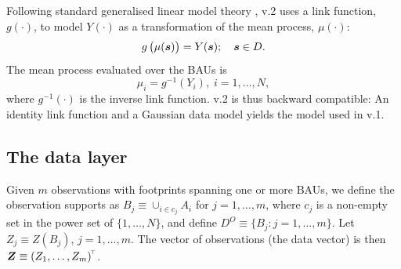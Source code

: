 \documentclass[article]{jss}
\def\mbf#1{{%
\mathchoice%
{\hbox{\boldmath$\displaystyle{#1}$}}%
{\hbox{\boldmath$\textstyle{#1}$}}%
{\hbox{\boldmath$\scriptstyle{#1}$}}%
{\hbox{\boldmath$\scriptscriptstyle{#1}$}}%
}}
\def\vec{\mbf}
\newcommand{\tp}{{\!\scriptscriptstyle \top}}
\begin{document}
Following standard generalised linear model theory \citep{McCullagh_Nelder_1989_GLM},  v.2 uses a link function, $g(\cdot)$, to model $Y(\cdot)$ as a transformation of the mean process, $\mu(\cdot)$:
\[
g\left(\mu(\vec{s})\right) = Y(\vec{s}); \quad \vec{s} \in D.
\]
The mean process evaluated over the BAUs is 
\[
\mu_i = g^{-1}(Y_i), \; i = 1, \dots, N,
\]
where $g^{-1}(\cdot)$ is the inverse link function. 
  v.2 is thus backward compatible: An identity link function and a Gaussian data model yields the model used in  v.1.


\subsection{The data layer}\label{subsection:04-02:DataLayer}




Given $m$ observations with footprints spanning one or more BAUs, we define the observation supports as $B_j \equiv \cup_{i\in c_j} A_i$ for $j = 1, \dots, m$, where $c_j$ is a non-empty set in the power set of $\{1, \dots, N\}$, and define $D^O \equiv \{B_j : j = 1, \dots, m\}$. 
Let $Z_j \equiv Z(B_j)$, $j = 1, \dots, m$. 
The vector of observations (the data vector) is then $\vec{Z} \equiv \left(Z_1, \dots, Z_m\right)^\tp$.
\end{document}
